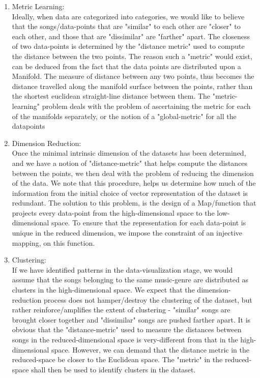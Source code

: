 \documentclass[12pt]{article}
\begin{document}
\begin{enumerate}
\item Metric Learning:\\
Ideally, when data are categorized into categories, we would like to believe that the songs/data-points that are "similar" to each other are "closer" to each other, and those that are "dissimilar" are "farther" apart. The closeness of two data-points is determined by the "distance metric" used to compute the distance between the two points. The reason such a "metric" would exist, can be deduced from the fact that the data points are distributed upon a Manifold. The measure of distance between any two points, thus becomes the distance travelled along the manifold surface between the points, rather than the shortest euclidean straight-line distance between them. The "metric-learning" problem deals with the problem of ascertaining the metric for each of the manifolds separately, or the notion of a "global-metric" for all the datapoints

\item Dimension Reduction:\\
Once the minimal intrinsic dimension of the datasets has been determined, and we have a notion of "distance-metric" that helps compute the distances between the points, we then deal with the problem of reducing the dimension of the data. We note that this procedure, helps us determine how much of the information from the initial choice of vector representation of the dataset is redundant. The solution to this problem, is the design of a Map/function that projects every data-point from the high-dimensional space to the low-dimensional space. To ensure that the representation for each data-point is unique in the reduced dimension, we impose the constraint of an injective mapping, on this function. 


\item Clustering:\\
If we have identified patterns in the data-visualization stage, we would assume that the songs belonging to the same music-genre are distributed as clusters in the high-dimensional space. We expect that the dimension-reduction process does not hamper/destroy the clustering of the dataset, but rather reinforce/amplifies the extent of clustering - "similar" songs are brought closer together and "dissimilar" songs are pushed farther apart. It is obvious that the "distance-metric" used to measure the distances between songs in the reduced-dimensional space is very-different from that in the high-dimensional space. However, we can demand that the distance metric in the reduced-space be closer to the Euclidean space. The "metric" in the reduced-space shall then be used to identify clusters in the dataset. 


\end{enumerate}
\end{document}
